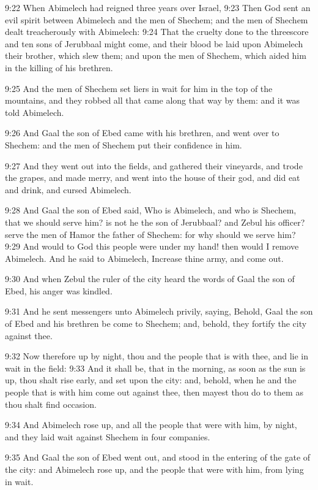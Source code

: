 9:22 When Abimelech had reigned three years over Israel, 9:23 Then God
sent an evil spirit between Abimelech and the men of Shechem; and the
men of Shechem dealt treacherously with Abimelech: 9:24 That the
cruelty done to the threescore and ten sons of Jerubbaal might come,
and their blood be laid upon Abimelech their brother, which slew them;
and upon the men of Shechem, which aided him in the killing of his
brethren.

9:25 And the men of Shechem set liers in wait for him in the top of
the mountains, and they robbed all that came along that way by them:
and it was told Abimelech.

9:26 And Gaal the son of Ebed came with his brethren, and went over to
Shechem: and the men of Shechem put their confidence in him.

9:27 And they went out into the fields, and gathered their vineyards,
and trode the grapes, and made merry, and went into the house of their
god, and did eat and drink, and cursed Abimelech.

9:28 And Gaal the son of Ebed said, Who is Abimelech, and who is
Shechem, that we should serve him? is not he the son of Jerubbaal? and
Zebul his officer? serve the men of Hamor the father of Shechem: for
why should we serve him?  9:29 And would to God this people were under
my hand! then would I remove Abimelech. And he said to Abimelech,
Increase thine army, and come out.

9:30 And when Zebul the ruler of the city heard the words of Gaal the
son of Ebed, his anger was kindled.

9:31 And he sent messengers unto Abimelech privily, saying, Behold,
Gaal the son of Ebed and his brethren be come to Shechem; and, behold,
they fortify the city against thee.

9:32 Now therefore up by night, thou and the people that is with thee,
and lie in wait in the field: 9:33 And it shall be, that in the
morning, as soon as the sun is up, thou shalt rise early, and set upon
the city: and, behold, when he and the people that is with him come
out against thee, then mayest thou do to them as thou shalt find
occasion.

9:34 And Abimelech rose up, and all the people that were with him, by
night, and they laid wait against Shechem in four companies.

9:35 And Gaal the son of Ebed went out, and stood in the entering of
the gate of the city: and Abimelech rose up, and the people that were
with him, from lying in wait.

